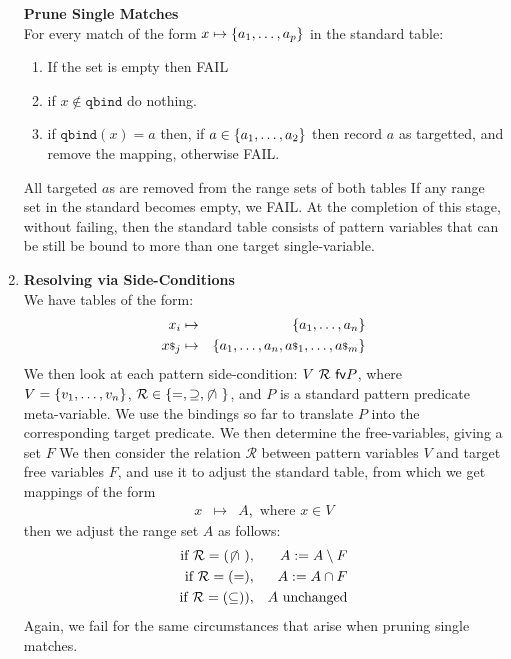 \begin{enumerate}
\textbf{Prune Single Matches}\\
  \label{enum:prune}
  For every match of the form $x \mapsto \{a_1,\ldots,a_p\}$
  in the standard table:
  \begin{enumerate}
    \item If the set is empty then FAIL
    \item if $x \notin \texttt{qbind}$ do nothing.
    \item if $\texttt{qbind}(x) = a$ then, if $a \in \{a_1,\ldots,a_2\}$
     then record $a$ as targetted, and remove the mapping,
     otherwise FAIL.
  \end{enumerate}
  All targeted $a$s are removed
  from the range sets of both tables
  If any range set in the standard becomes empty, we FAIL.
  At the completion of this stage, without failing,
  then the standard table consists of pattern variables
  that can be still be bound to more than one target single-variable.

\item

\textbf{Resolving via Side-Conditions} \\
We have tables of the form:
\begin{eqnarray*}
  x_i &\mapsto& \{a_1,\ldots,a_n\}
\\ {x}{\scriptstyle\$}_j &\mapsto& \{a_1,\ldots,a_n,{a}{\scriptstyle\$}_1,\ldots,{a}{\scriptstyle\$}_m\}
\end{eqnarray*}
We then look at each pattern side-condition: $V~\mathcal R~\mathsf{fv} P$,
where $V=\{v_1,\ldots,v_n\}$,
$\mathcal R \in \{=,\supseteq,\mathrel{\not\!\cap~}\}$,
and $P$ is a standard pattern predicate meta-variable.
We use the bindings so far to translate $P$ into the corresponding
target predicate.
We then determine the free-variables, giving a set $F$
We then consider the relation $\mathcal R$  between pattern variables $V$
and target free variables $F$, and use it to adjust the standard table,
from which we get mappings of the form
\begin{eqnarray*}
 x  &\mapsto&  A, \mbox{ where } x \in V
\end{eqnarray*}
then we adjust the range set $A$ as follows:
\begin{eqnarray*}
   \mbox{if }\mathcal R = (\mathrel{\not\!\cap~})      &,& A := A \setminus F
\\ \mbox{if }\mathcal R = (=)          &,& A := A \cap F
\\ \mbox{if }\mathcal R = (\subseteq)) &,& A \mbox{ unchanged}
\end{eqnarray*}
Again, we fail for the same circumstances that arise when pruning single matches.


\end{enumerate}
